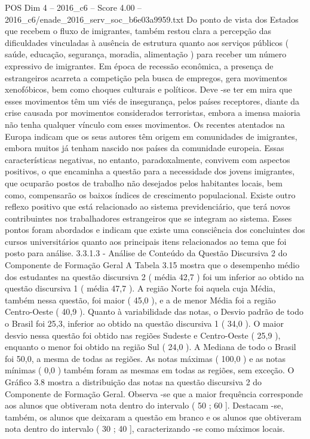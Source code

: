\begin{textsample}{POS Dim 4 – 2016\_c6 – Score 4.00 – 2016\_c6/enade\_2016\_serv\_soc\_b6e03a9959.txt}
Do ponto de vista dos Estados que recebem o fluxo de imigrantes, também restou clara a percepção das dificuldades vinculadas à ausência de estrutura quanto aos serviços públicos ( saúde, educação, segurança, moradia, alimentação ) para receber um número expressivo de imigrantes.
Em época de recessão econômica, a presença de estrangeiros acarreta a competição pela busca de empregos, gera movimentos xenofóbicos, bem como choques culturais e políticos.
Deve -se ter em mira que esses movimentos têm um viés de insegurança, pelos países receptores, diante da crise causada por movimentos considerados terroristas, embora a imensa maioria não tenha qualquer vínculo com esses movimentos.
Os recentes atentados na Europa indicam que os seus autores têm origem em comunidades de imigrantes, embora muitos já tenham nascido nos países da comunidade europeia.
Essas características negativas, no entanto, paradoxalmente, convivem com aspectos positivos, o que encaminha a questão para a necessidade dos jovens imigrantes, que ocuparão postos de trabalho não desejados pelos habitantes locais, bem como, compensarão os baixos índices de crescimento populacional.
Existe outro reflexo positivo que está relacionado ao sistema previdenciário, que terá novos contribuintes nos trabalhadores estrangeiros que se integram ao sistema.
Esses pontos foram abordados e indicam que existe uma consciência dos concluintes dos cursos universitários quanto aos principais itens relacionados ao tema que foi posto para análise. 3.3.1.3 - Análise de Conteúdo da Questão Discursiva 2 do Componente de Formação Geral A Tabela 3.15 mostra que o desempenho médio dos estudantes na questão discursiva 2 ( média 42,7 ) foi um inferior ao obtido na questão discursiva 1 ( média 47,7 ).
A região Norte foi aquela cuja Média, também nessa questão, foi maior ( 45,0 ), e a de menor Média foi a região Centro-Oeste ( 40,9 ).
Quanto à variabilidade das notas, o Desvio padrão de todo o Brasil foi 25,3, inferior ao obtido na questão discursiva 1 ( 34,0 ).
O maior desvio nessa questão foi obtido nas regiões Sudeste e Centro-Oeste ( 25,9 ), enquanto o menor foi obtido na região Sul ( 24,0 ).
A Mediana de todo o Brasil foi 50,0, a mesma de todas as regiões.
As notas máximas ( 100,0 ) e as notas mínimas ( 0,0 ) também foram as mesmas em todas as regiões, sem exceção.
O Gráfico 3.8 mostra a distribuição das notas na questão discursiva 2 do Componente de Formação Geral.
Observa -se que a maior frequência corresponde aos alunos que obtiveram nota dentro do intervalo ( 50 ; 60 ].
Destacam -se, também, os alunos que deixaram a questão em branco e os alunos que obtiveram nota dentro do intervalo ( 30 ; 40 ], caracterizando -se como máximos locais.

\end{textsample}

